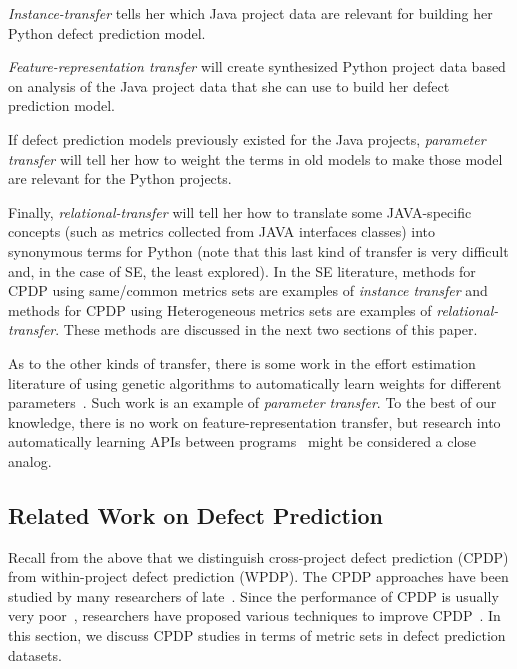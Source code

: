 \bi
\item
{\em Instance-transfer} tells her which Java project data are relevant
for building her Python defect prediction model.
\item
{\em Feature-representation transfer} will create synthesized Python
project data based on analysis of the Java project data that she can
use to build her defect prediction model.  
\item
If defect prediction models previously existed for the Java projects,
{\em parameter transfer} will tell her how to weight the terms in old
models to make those model are relevant for the Python projects.
\item
Finally, {\em relational-transfer} will tell her how to translate some
JAVA-specific concepts (such as metrics collected from JAVA interfaces
classes) into synonymous terms for Python (note that this last kind
of transfer is very difficult and, in the case of SE, the least
explored).
\ei
In the SE literature, methods for CPDP using same/common metrics sets are examples 
of {\em instance transfer} and methods for CPDP using Heterogeneous metrics sets are examples
of {\em relational-transfer}. These methods are discussed in the next two sections of this paper.

As to the other kinds of transfer, there is some work in the effort estimation literature of using
genetic algorithms to automatically learn weights for different parameters~\cite{sigweni2014feature}. Such work is an example of {\em parameter transfer}.
To the best of our knowledge, there is no work on feature-representation transfer, but research into automatically
learning APIs between programs~\cite{dallmeier2012automatically} might be considered a close analog.



\subsection{Related Work on Defect Prediction}
\label{sec:Background}
Recall from the above that we distinguish cross-project defect prediction (CPDP) from within-project defect prediction (WPDP).
The CPDP approaches have been studied by many researchers
of late~\cite{Canfora13,Ma12,Nam13,Panichella14,Rahman12,Ryu14,Ryu15,Turhan09,Zhang15,Zimmermann09}. Since the performance
of CPDP is usually very poor~\cite{Zimmermann09}, researchers have proposed various techniques to
improve CPDP~\cite{Canfora13,Ma12,Nam13,Panichella14,Ryu14,Ryu15,Turhan09,Watanabe08}. In this section, we discuss CPDP studies in terms of metric sets in defect prediction datasets.

